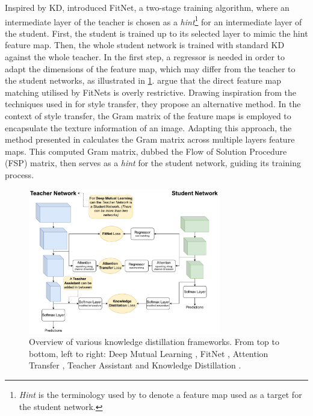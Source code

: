 Inspired by \ac{KD}, \cite{DBLP:journals/corr/RomeroBKCGB14} introduced FitNet,
a two-stage training algorithm, where an intermediate layer of the teacher is
chosen as a \emph{hint}\footnote{\emph{Hint} is the terminology used by
\citeauthor{DBLP:journals/corr/RomeroBKCGB14}
\cite{DBLP:journals/corr/RomeroBKCGB14} to denote a feature map used as a target
for the student network.} for an intermediate layer of the student. First, the
student is trained up to its selected layer to mimic the hint feature map. Then,
the whole student network is trained with standard \ac{KD} against the whole
teacher. In the first step, a regressor is needed in order to adapt the
dimensions of the feature map, which may differ from the teacher to the student
networks, as illustrated in \cref{fig:sota:kd_frameworks}.
\citeauthor{DBLP:conf/cvpr/YimJBK17} argue that the direct feature map matching
utilised by FitNets is overly restrictive. Drawing inspiration from the
techniques used in \cite{DBLP:journals/corr/GatysEB15a} for style transfer, they
propose an alternative method. In the context of style transfer, the Gram matrix
of the feature maps is employed to encapsulate the texture information of an
image. Adapting this approach, the method presented in
\cite{DBLP:conf/cvpr/YimJBK17} calculates the Gram matrix across multiple layers
feature maps. This computed Gram matrix, dubbed the Flow of Solution Procedure
(FSP) matrix, then serves as a \emph{hint} for the student network, guiding its
training process.\\

\begin{figure}[htbp]
    \centering
    \includegraphics[width=0.75\textwidth]{chapter_sota/assets/kd_frameworks.pdf}
    \caption{Overview of various knowledge distillation frameworks. From top to
    bottom, left to right: Deep Mutual Learning
    \cite{DBLP:conf/cvpr/ZhangXHL18}, FitNet
    \cite{DBLP:journals/corr/RomeroBKCGB14}, Attention Transfer
    \cite{DBLP:conf/iclr/ZagoruykoK17}, Teacher Assistant
    \cite{DBLP:conf/aaai/MirzadehFLLMG20} and Knowledge Distillation
    \cite{DBLP:journals/corr/HintonVD15}.}
    \label{fig:sota:kd_frameworks}
\end{figure}

